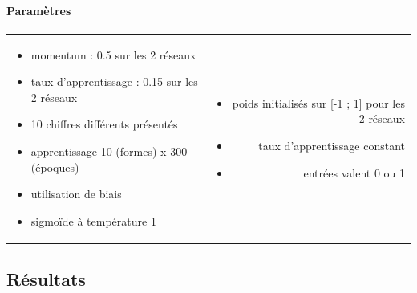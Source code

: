     \paragraph{Paramètres}
      \begin{center}
	\begin{tabular}{lr}
	  \begin{minipage}{230px}
	    \begin{itemize}
	      \item momentum : 0.5 sur les 2 réseaux
	      \item taux d'apprentissage : 0.15 sur les 2 réseaux
	      \item 10 chiffres différents présentés
	      \item apprentissage 10 (formes) x 300 (époques)
	      \item utilisation de biais
	      \item sigmoïde à température 1
	    \end{itemize}
	  \end{minipage}
	  &
	  \begin{minipage}{230px}
	    \begin{itemize}
	      \item poids initialisés sur [-1 ; 1] pour les 2 réseaux
	      \item taux d'apprentissage constant
	      \item entrées valent 0 ou 1
	    \end{itemize}
	  \end{minipage}
	\end{tabular}
      \end{center}

  
  \newpage
  \subsection{Résultats}
